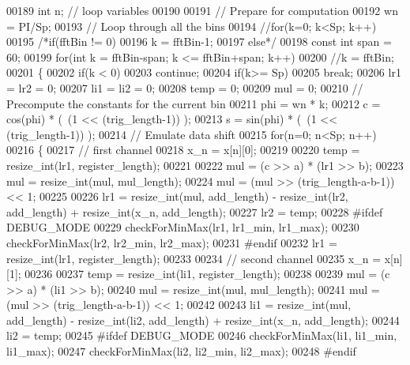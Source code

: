 \begin{DoxyCode}
00189   \textcolor{keywordtype}{int} n;         \textcolor{comment}{// loop variables}
00190 
00191   \textcolor{comment}{// Prepare for computation}
00192   wn = PI/Sp;
00193   \textcolor{comment}{// Loop through all the bins}
00194   \textcolor{comment}{//for(k=0; k<Sp; k++)}
00195   \textcolor{comment}{/*if(fftBin != 0)}
00196 \textcolor{comment}{    k = fftBin-1;}
00197 \textcolor{comment}{  else*/}
00198     \textcolor{keyword}{const} \textcolor{keywordtype}{int} span = 60;
00199 \textcolor{keywordflow}{for}(\textcolor{keywordtype}{int} k = fftBin-span; k <= fftBin+span; k++)
00200   \textcolor{comment}{//k = fftBin;}
00201   \{
00202       \textcolor{keywordflow}{if}(k < 0)
00203         \textcolor{keywordflow}{continue};
00204     \textcolor{keywordflow}{if}(k>= Sp)
00205         \textcolor{keywordflow}{break};
00206     lr1 = lr2 = 0;
00207     li1 = li2 = 0;
00208     temp = 0;
00209     mul = 0;
00210     \textcolor{comment}{// Precompute the constants for the current bin}
00211     phi = wn * k;
00212     c = cos(phi) * (~(1 << (trig\_length-1)) );
00213     s = sin(phi) * (~(1 << (trig\_length-1)) );
00214     \textcolor{comment}{// Emulate data shift}
00215     \textcolor{keywordflow}{for}(n=0; n<Sp; n++)
00216     \{
00217       \textcolor{comment}{// first channel}
00218       x\_n = x[n][0];
00219 
00220       temp = resize_int(lr1, register\_length);
00221 
00222       mul  = (c >> a) * (lr1 >> b);
00223       mul  = resize_int(mul, mul\_length);
00224       mul  = (mul >> (trig\_length-a-b-1)) << 1;
00225 
00226       lr1 = resize_int(mul, add\_length) - resize_int(lr2, add\_length) + 
      resize_int(x\_n, add\_length);
00227       lr2 = temp;
00228 \textcolor{preprocessor}{      #ifdef DEBUG\_MODE}
00229         checkForMinMax(lr1, lr1\_min, lr1\_max);
00230         checkForMinMax(lr2, lr2\_min, lr2\_max);
00231 \textcolor{preprocessor}{      #endif}
00232       lr1 = resize_int(lr1, register\_length);
00233 
00234       \textcolor{comment}{// second channel}
00235       x\_n = x[n][1];
00236 
00237       temp = resize_int(li1, register\_length);
00238 
00239       mul  = (c >> a) * (li1 >> b);
00240       mul  = resize_int(mul, mul\_length);
00241       mul  = (mul >> (trig\_length-a-b-1)) << 1;
00242 
00243       li1 = resize_int(mul, add\_length) - resize_int(li2, add\_length) + 
      resize_int(x\_n, add\_length);
00244       li2 = temp;
00245 \textcolor{preprocessor}{      #ifdef DEBUG\_MODE}
00246         checkForMinMax(li1, li1\_min, li1\_max);
00247         checkForMinMax(li2, li2\_min, li2\_max);
00248 \textcolor{preprocessor}{      #endif}

\end{DoxyCode}
